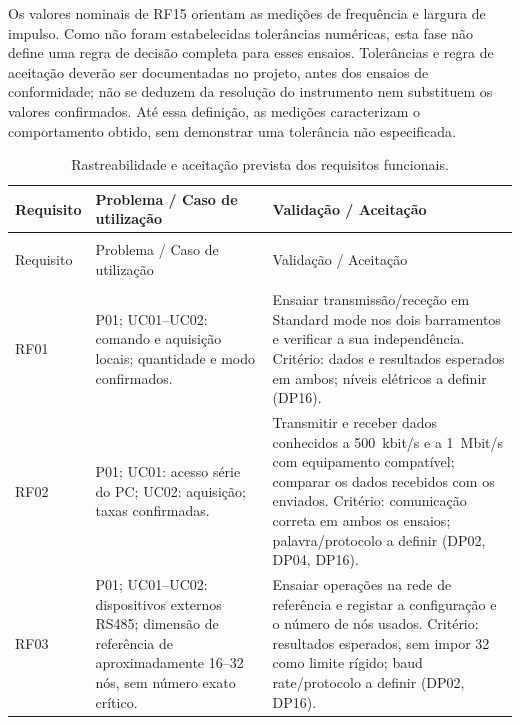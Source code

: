 Os valores nominais de RF15 orientam as medições de frequência e largura
de impulso. Como não foram estabelecidas tolerâncias numéricas, esta
fase não define uma regra de decisão completa para esses ensaios.
Tolerâncias e regra de aceitação deverão ser documentadas no projeto,
antes dos ensaios de conformidade; não se deduzem da resolução do
instrumento nem substituem os valores confirmados. Até essa definição,
as medições caracterizam o comportamento obtido, sem demonstrar
uma tolerância não especificada.

\begingroup
\small
{}
\setlength{\tabcolsep}{4pt}
\renewcommand{\arraystretch}{1.12}
\begin{longtable}{@{}>{\raggedright\arraybackslash}p{}>{\raggedright\arraybackslash}p{}>{\raggedright\arraybackslash}p{}@{}}
\caption{Rastreabilidade e aceitação prevista dos requisitos funcionais.}\label{tab:rastreabilidade-requisitos}\\
\toprule
\rowcolor{LasetTint}
Requisito & Problema / Caso de utilização & Validação / Aceitação \\
\midrule
\endfirsthead
\multicolumn{3}{c}{\tablename~\thetable{} (continuação)}\\
\toprule
\rowcolor{LasetTint}
Requisito & Problema / Caso de utilização & Validação / Aceitação \\
\midrule
\endhead
\midrule
\multicolumn{3}{r}{Continua na página seguinte}\\
\endfoot
\bottomrule
\endlastfoot
RF01 & P01; UC01--UC02: comando e aquisição locais; quantidade e modo confirmados. & Ensaiar transmissão/receção em Standard mode nos dois barramentos e verificar a sua independência. Critério: dados e resultados esperados em ambos; níveis elétricos a definir (DP16). \\
\addlinespace
RF02 & P01; UC01: acesso série do PC; UC02: aquisição; taxas confirmadas. & Transmitir e receber dados conhecidos a 500~kbit/s e a 1~Mbit/s com equipamento compatível; comparar os dados recebidos com os enviados. Critério: comunicação correta em ambos os ensaios; palavra/protocolo a definir (DP02, DP04, DP16). \\
\addlinespace
RF03 & P01; UC01--UC02: dispositivos externos RS485; dimensão de referência de aproximadamente 16--32 nós, sem número exato crítico. & Ensaiar operações na rede de referência e registar a configuração e o número de nós usados. Critério: resultados esperados, sem impor 32 como limite rígido; baud rate/protocolo a definir (DP02, DP16). \\

\end{longtable}
